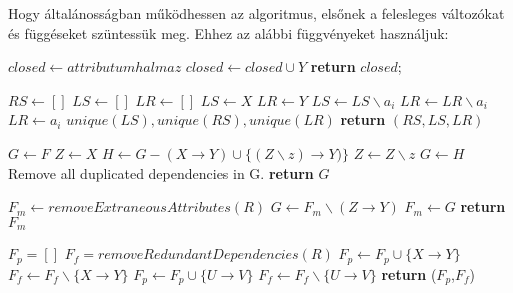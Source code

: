 Hogy általánosságban működhessen az algoritmus, elsőnek a felesleges változókat és függéseket szüntessük meg. Ehhez az alábbi függvényeket használjuk:
\hfill \break
\begin{algorithmic}
        \State $closed \gets attributumhalmaz$
                \State $closed \gets closed \cup Y$
            \EndIf
        \EndWhile
        \State \textbf{return} $closed$;
    \EndFunction
    \hfill \break
    
    \State $RS \gets []$
    \State $LS \gets []$
    \State $LR \gets []$
        \State $LS \gets X$
        \State $LR \gets Y$
                \State $LS \gets LS \backslash a_i$
                \State $LR \gets LR \backslash a_i$
                \State $LR \gets a_i$
            \EndIf
        \EndFor
    \EndFor
    \State $unique(LS),unique(RS),unique(LR)$
    \State \textbf{return} $(RS,LS,LR)$
    \EndFunction
    \hfill \break
    
    \State $G \gets F$
            \State $Z \gets X$
                    \State $H \gets G - (X \rightarrow Y) \cup \{ (Z \backslash z) \rightarrow Y) \}$
                        \State $Z \gets Z \backslash z$
                    \EndIf
                \EndIf
            \EndFor
                \State $G \gets H$
            \EndIf
        \EndIf
    \EndFor
    \State Remove all duplicated dependencies in G.
    \State \textbf{return} $G$
    \EndFunction
    \hfill \break
    
    \State $F_m \gets removeExtraneousAttributes(R)$
            \State $G \gets F_m \backslash (Z \rightarrow Y)$
                \State $F_m \gets G$
            \EndIf
        \EndWhile
    \EndFor
    \State \textbf{return} $F_m$
    \EndFunction
    \hfill \break
    
    \State $F_p = []$
    \State $F_f = removeRedundantDependencies(R)$
            \State $F_p \gets F_p \cup \{ X \rightarrow Y \}$
            \State $F_f \gets F_f \backslash \{X \rightarrow Y\}$
        \EndIf
            \State $F_p \gets F_p \cup \{U \rightarrow V\}$
            \State $F_f \gets F_f \backslash \{U \rightarrow V\}$
        \EndWhile
    \EndFor
    \State \textbf{return} ($F_p$,$F_f$) 
    \EndFunction
    \hfill \break
\end{algorithmic}

